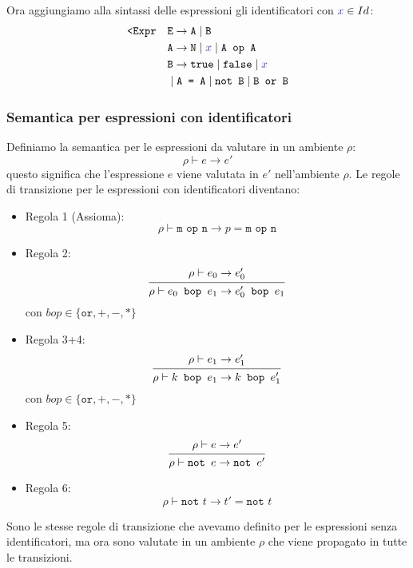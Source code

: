 \documentclass[a4paper]{article}
\begin{document}
\vspace{1em}
\noindent
Ora aggiungiamo alla sintassi delle espressioni gli identificatori 
con \( \mathcolor{Blue}{x} \in Id \):
\[
  \begin{aligned}
    \texttt{<Expr} \quad &\texttt{E} \to \texttt{A} \mid \texttt{B} \\
                         &\texttt{A} \to \texttt{N}  \mid \mathcolor{Blue}{x} \mid  \texttt{A op A} \\
                         &\texttt{B} \to \texttt{true} \mid \texttt{false}  \mid \textcolor{Blue}{x} \\
                         &\mid \texttt{A = A} \mid \texttt{not B} \mid \texttt{B or B}
  \end{aligned}
\] 


\subsubsection{Semantica per espressioni con identificatori}
Definiamo la semantica per le espressioni da valutare in un ambiente \( \rho  \):
\[
  \rho \vdash e \to e'
\] 
questo significa che l'espressione \( e \) viene valutata in \( e' \) nell'ambiente \( \rho \).
Le regole di transizione per le espressioni con identificatori diventano:
\begin{itemize}
  \item Regola 1 (Assioma):
    \[
      \rho \vdash \texttt{m op n} \to p = \texttt{m op n}
    \] 

  \item Regola 2:
    \[
      \begin{prooftree}
        \hypo{\rho \vdash e_0 \to e'_0}
        \infer1{\rho \vdash e_0 \texttt{ bop } e_1 \to e'_0 \texttt{ bop } e_1}
      \end{prooftree}
    \]
    con \( bop \in \{\texttt{or}, +, -, *\} \)

  \item Regola 3+4:
    \[
      \begin{prooftree}
        \hypo{\rho \vdash e_1 \to e'_1}
        \infer1{\rho \vdash k \texttt{ bop } e_1 \to k \texttt{ bop } e'_1}
      \end{prooftree}
    \]
    con \( bop \in \{\texttt{or}, +, -, *\} \)

  \item Regola 5:
    \[
      \begin{prooftree}
        \hypo{\rho \vdash e \to e'}
        \infer1{\rho \vdash \texttt{not } e \to \texttt{not } e'}
      \end{prooftree}
    \]

  \item Regola 6:
    \[
      \rho \vdash \texttt{not } t \to t' = \texttt{not } t
    \]
\end{itemize}
Sono le stesse regole di transizione che avevamo definito per le espressioni senza
identificatori, ma ora sono valutate in un ambiente \( \rho \) che viene propagato in
tutte le transizioni.
\end{document}
